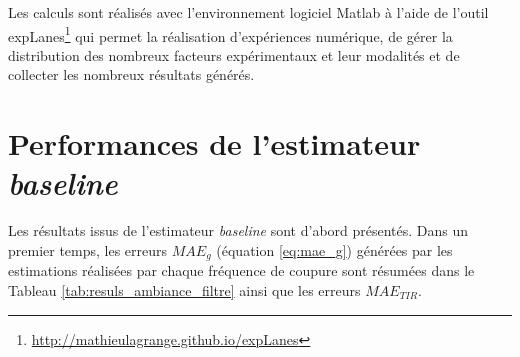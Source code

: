 Les calculs sont réalisés avec l'environnement logiciel Matlab à l'aide de l'outil expLanes\footnote{\url{http://mathieulagrange.github.io/expLanes}} qui permet la réalisation d'expériences numérique, de gérer la distribution des nombreux facteurs expérimentaux et leur modalités et de collecter les nombreux résultats générés. %

\section{Performances de l'estimateur \textit{baseline}}

Les résultats issus de l'estimateur \textit{baseline} sont d'abord présentés. Dans un premier temps, les erreurs $MAE_g$ (équation \ref{eq:mae_g}) générées par les estimations réalisées par chaque fréquence de coupure sont résumées dans le Tableau \ref{tab:resuls_ambiance_filtre} ainsi que les erreurs $MAE_{TIR}$.

\begin{table}[h]
\centering
\caption{Erreurs $MAE_g$ de l'estimateur \textit{baseline} selon $f_c$ sur l'ensemble du corpus \textit{Ambiance} et pour chaque $TIR$. En gras-rouge l'erreur $MAE_g$ la plus faible, en gras-noir, les erreurs $MAE_{TIR}$ les plus faibles selon les fréquences $f_c$.}
\label{tab:resuls_ambiance_filtre}
\end{table}

